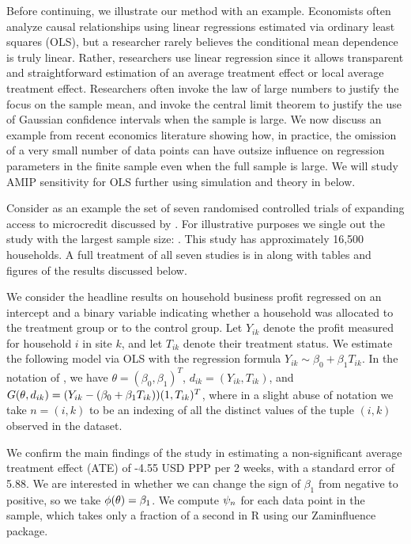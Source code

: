 
Before continuing, we illustrate our method with an example. Economists often
analyze causal relationships using linear regressions estimated via ordinary
least squares (OLS), but a researcher rarely believes the conditional mean
dependence is truly linear. Rather, researchers use linear regression since it
allows transparent and straightforward estimation of an average treatment effect
or local average treatment effect. Researchers often invoke the law of large
numbers to  justify the focus on the sample mean, and invoke the central limit
theorem to justify the use of Gaussian confidence intervals when the sample is
large. We now discuss an example from recent economics literature showing how,
in practice, the omission of a very small number of data points can have outsize
influence on regression parameters in the finite sample even when the full
sample is large. We will study AMIP sensitivity for OLS further using simulation
and theory in  below.

Consider as an example the set of seven randomised controlled trials of
expanding access to microcredit discussed by \citet{meager2019understanding}.
For illustrative purposes we single out the study with the largest sample size:
\citet{angelucci2015microcredit}. This study has approximately 16,500
households. A full treatment of all seven studies is in
 along with
tables and figures of the results discussed below.

We consider the headline results on household business profit regressed on an
intercept and a binary variable indicating whether a household was allocated to
the treatment group or to the control group. Let $Y_{ik}$ denote the profit
measured for household $i$ in site $k$, and let $T_{ik}$ denote their treatment
status. We estimate the following model via OLS with the regression formula
$Y_{ik} \sim \beta_0 + \beta_1 T_{ik}$. In the notation of
, we have $\theta = (\beta_0, \beta_1)^T$, $d_{ik} =
(Y_{ik}, T_{ik})$, and 
$G(\theta, d_{ik}) = (Y_{ik} -(\beta_0 + \beta_1 T_{ik})) (1, T_{ik})^T$,
where in a slight abuse of notation we take $n=(i,k)$ to be an indexing
of all the distinct values of the tuple $(i,k)$ observed in the dataset.

We confirm the main findings of the study in estimating a non-significant
average treatment effect (ATE) of -4.55 USD PPP per 2 weeks, with a standard
error of 5.88. We are interested in whether we can change the sign of $\beta_1$
from negative to positive, so we take $\phi(\theta) = \beta_1$. We compute
$\psi_n$ for each data point in the sample, which takes only a fraction of a
second in \textsf{R} using our Zaminfluence package.

